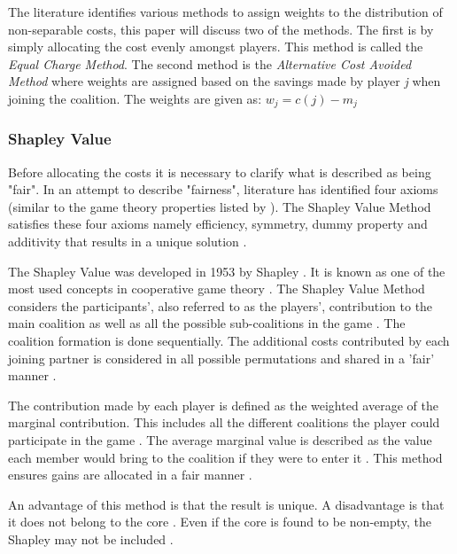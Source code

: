 The literature identifies various methods to assign weights to the distribution of non-separable costs, this paper will discuss two of the methods. The first is by simply allocating the cost evenly amongst players. This method is called the \textit{Equal Charge Method}. The second method is the \textit{Alternative Cost Avoided Method} where weights are assigned based on the savings made by player \textit{j} when joining the coalition. The weights are given as: \( w_j = c(j) - m_j\)

\subsubsection{Shapley Value}
Before allocating the costs it is necessary to clarify what is described as being "fair". In an attempt to describe "fairness", literature has identified four axioms (similar to the game theory properties listed by \citep{ozener2008allocating}). The Shapley Value Method satisfies these four axioms namely efficiency, symmetry, dummy property and additivity that results in a unique solution \citep{guajardo2016review}.\par

The Shapley Value was developed in 1953 by Shapley \citep{ouhader2017combining}. It is known as one of the most used concepts in cooperative game theory \citep{ouhader2017combining}.
The Shapley Value Method considers the participants', also referred to as the players', contribution to the main coalition as well as all the possible sub-coalitions in the game \citep{ouhader2017combining}. The coalition formation is done sequentially. The additional costs contributed by each joining partner is considered in all possible permutations and shared in a 'fair' manner \citep{defryn2013gain}. 

The contribution made by each player is defined as the weighted average of the marginal contribution. This includes all the different coalitions the player could participate in the game \citep{ouhader2017combining}. The average marginal value is described as the value each member would bring to the coalition if they were to enter it \citep{ozener2008allocating}. This method ensures gains are allocated in a fair manner \citep{janjevic2018investigating}.


An advantage of this method is that the result is unique. A disadvantage is that it does not belong to the core \citep{guajardo2016review}. Even if the core is found to be non-empty, the Shapley may not be included \citep{ozener2008allocating}.

